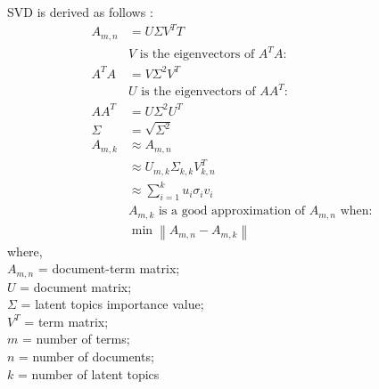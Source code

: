 \documentclass[12pt]{article}
\begin{document}
SVD is derived as follows \parencite{Sumedha_2018}:
\begin{equation}
  \begin{aligned}
    A_{m,n} & = U \Sigma V^{T} {T}                                        \\
            & \text{$V$ is the eigenvectors of $A^{T} A$:}                \\
    A^{T} A & = V \Sigma^{2} V^{T}                                        \\
            & \text{$U$ is the eigenvectors of $A A^{T}$:}                \\
    A A^{T} & = U \Sigma^{2} U^{T}                                        \\
    \Sigma  & = \sqrt{\Sigma^{2}}                                         \\
    A_{m,k} & \approx A_{m,n}
    \\ & \approx U_{m,k} \Sigma_{k,k} V^{T}_{k,n}\\
            & \approx \sum_{i = 1}^{k}u_i \sigma_i v_i                    \\
            & \text{$A_{m,k}$ is a good approximation of $A_{m,n}$ when:} \\
            & \min \left\lVert A_{m,n} -A_{m,k}\right\rVert
  \end{aligned}
\end{equation}
where,\\
$A_{m,n}$ = document-term matrix;\\
$U$ = document matrix;\\
$\Sigma$ = latent topics importance value; \\
$V^{T}$ = term matrix; \\
$m$ = number of terms;\\
$n$ = number of documents;\\
$k$ = number of latent topics\\
\end{document}
